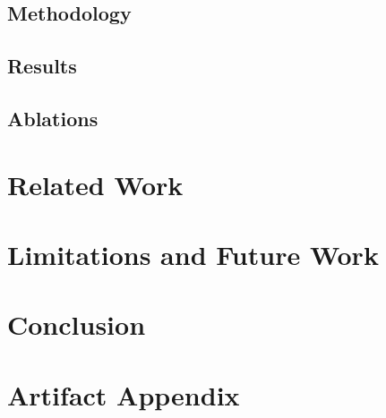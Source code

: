 \documentclass{article}          %
\begin{document}
\subsection{Methodology}
\subsection{Results}
\subsection{Ablations}

\section{Related Work}
\label{sec:related}

\section{Limitations and Future Work}
\label{sec:limitations}

\section{Conclusion}
\label{sec:conclusion}



\appendix
\section{Artifact Appendix}
\end{document}
